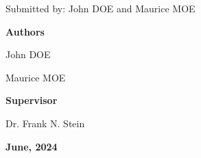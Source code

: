 \begin{titlepage}
\begin{center}
  \vspace{0.5cm} 

  \small Submitted by: John DOE and Maurice MOE

  \vspace{0.4cm}

  \HRule 

  \vspace{1.5cm}


  \begin{minipage}[t]{0.3\textwidth}
    \begin{flushleft}
      \textbf{Authors}
      \vspace{0.8cm}

        John DOE

      \vspace{0.2cm}

        Maurice MOE

    \end{flushleft}
  \end{minipage}
  \begin{minipage}[t]{0.3\textwidth}
    \begin{flushleft}
      \textbf{Supervisor}
      \vspace{0.8cm}

      Dr. Frank N. Stein

    \end{flushleft}
  \end{minipage}

  \vfill


  {\small\bfseries June, 2024}

  \end{center}
\end{titlepage}